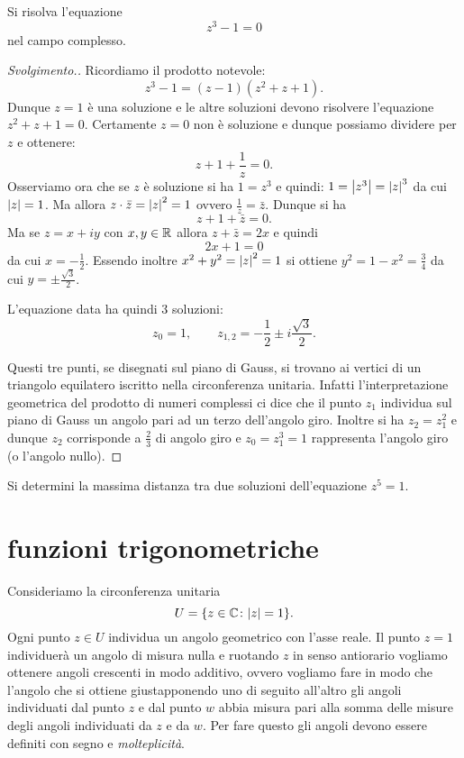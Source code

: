 \begin{exercise}
Si risolva l'equazione 
\[ 
 z^3 - 1 = 0
\]
nel campo complesso.
\end{exercise}
%
\begin{proof}[Svolgimento.]
Ricordiamo il prodotto notevole:
\[
  z^3 - 1 = (z-1)(z^2+z+1).
\]
Dunque $z=1$ è una soluzione e le altre soluzioni devono risolvere 
l'equazione $z^2+z+1=0$. 
Certamente $z=0$ non è soluzione e dunque possiamo dividere per $z$ 
e ottenere:
\[
  z + 1 + \frac 1 z = 0.
\]
Osserviamo ora che se $z$ è soluzione si ha $1=z^3$
e quindi: $1 = {\left|z^3\right|}= {\left|z\right|}^3$ da cui ${\left|z\right|} = 1$.
Ma allora $z\cdot \bar z = {\left|z\right|}^2 = 1$ ovvero $\frac 1 z = \bar z$.
Dunque si ha 
\[
    z + 1 + \bar z = 0.
\]
Ma se $z=x+iy$ con $x,y\in {\mathbb R}$ allora $z+\bar z = 2x$
e quindi 
\[
    2x + 1 = 0 
\]
da cui $x=-\frac 1 2$. Essendo inoltre $x^2+y^2={\left|z\right|}^2=1$ si ottiene
$y^2 = 1-x^2 = \frac 3 4$ da cui $y=\pm \frac{\sqrt 3}{2}$.

L'equazione data ha quindi $3$ soluzioni:
\[
z_0 = 1, \qquad 
z_{1,2} = -\frac 1 2 \pm i \frac{\sqrt 3} 2.
\]

Questi tre punti, se disegnati sul piano di Gauss, si trovano 
ai vertici di un triangolo equilatero iscritto nella circonferenza unitaria.
Infatti l'interpretazione geometrica del prodotto di numeri complessi ci dice 
che il punto $z_1$ individua sul piano di Gauss un angolo pari 
ad un terzo dell'angolo giro. Inoltre si ha $z_2 = z_1^2$ e dunque 
$z_2$ corrisponde a $\frac 2 3$ di angolo giro e $z_0=z_1^3 = 1$ rappresenta 
l'angolo giro (o l'angolo nullo).
\end{proof}

\begin{exercise}
Si determini la massima distanza tra due soluzioni 
dell'equazione $z^5=1$. 
\end{exercise}

\section{funzioni trigonometriche}
\label{sec:funzioni_trigonometriche}%
\label{sec:avvolgimento}%

Consideriamo la circonferenza unitaria 
\[
  U = {\left\{ z\in {\mathbb C}\colon {\left|z\right|} = 1 \right\}}.
\]
Ogni punto $z\in U$ individua un angolo geometrico con l'asse reale.
Il punto $z=1$ individuerà un angolo di misura nulla e 
ruotando $z$ in senso antiorario vogliamo ottenere angoli crescenti
in modo additivo, ovvero vogliamo fare in modo che l'angolo che si ottiene 
giustapponendo uno di seguito all'altro gli angoli individuati 
dal punto $z$ e dal punto $w$ abbia misura pari alla somma delle misure 
degli angoli individuati da $z$ e da $w$.
Per fare questo gli angoli devono essere definiti con segno e \emph{molteplicità}.

